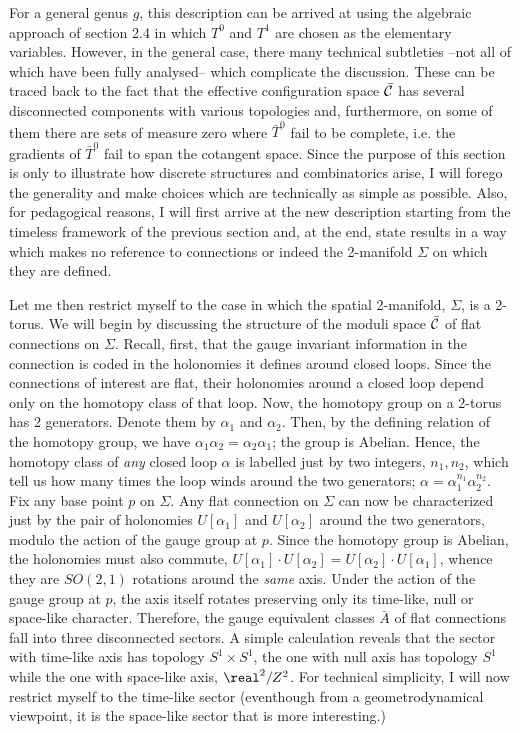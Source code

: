 For a general genus $g$, this description can be arrived at using the
algebraic approach of section 2.4 in which $T^0$ and $T^1$ are chosen as
the elementary variables. However, in the general case, there many
technical subtleties --not all of which have been fully analysed--
which complicate the discussion. These can be traced back to the fact that
the effective configuration space $\bar{\cal C}$ has several disconnected
components with various topologies and, furthermore, on some of them
there are sets of measure zero where $\bar{T}^0$ fail to be complete, i.e.
the gradients of $\bar{T}^0$ fail to span the cotangent space. Since the
purpose of this section is only to illustrate how discrete structures and
combinatorics arise, I will forego the generality and make choices which are
technically as simple as possible. Also, for pedagogical reasons, I will
first arrive at the new description starting from the timeless framework of
the previous section and, at the end, state results in a way which makes
no reference to connections or indeed the 2-manifold $\Sigma$ on which
they are defined.

Let  me then restrict myself to the case in which the spatial 2-manifold,
$\Sigma$, is a 2-torus. We will begin by discussing the structure of the
moduli space $\bar{\cal C}$ of flat connections on $\Sigma$. Recall, first,
that the gauge invariant information in the connection is coded in the
holonomies it defines around closed loops. Since the connections of interest
are flat, their holonomies around a closed loop depend only on the homotopy
class of that loop. Now, the homotopy group on a 2-torus has 2
generators. Denote them by $\alpha_1$ and $\alpha_2$. Then, by the defining
relation of the homotopy group, we have $\alpha_1 \alpha_2 =\alpha_2\alpha_1$;
the group is Abelian. Hence, the homotopy class of {\it any} closed loop
$\alpha$ is labelled just by two integers, $n_1, n_2$, which tell us how many
times the loop winds around the two generators; $\alpha =\alpha_1^{n_1}
\alpha_2^{n_2}$. Fix any base point $p$ on $\Sigma$. Any flat connection on
$\Sigma$ can now be characterized just by the pair of holonomies
$U[{\alpha_1}]$ and $U[{\alpha_2}]$ around the two generators, modulo the
action of the gauge group at $p$. Since the homotopy group is Abelian, the
holonomies must also commute, $U[\alpha_1]\cdot U[\alpha_2] = U[\alpha_2]
\cdot U[\alpha_1]$, whence they are $SO(2,1)$ rotations around the {\it same}
axis. Under the action of the gauge group at $p$, the axis itself rotates
preserving only its time-like, null or space-like character. Therefore, the
gauge equivalent classes $\bar{A}$ of flat connections fall into three
disconnected sectors. A simple calculation reveals that the sector with
time-like axis has topology $S^1\times S^1$, the one with null axis has
topology $S^1$ while the one with space-like axis, $\real^2/Z^2$.
For technical simplicity, I will now restrict myself to the time-like sector
(eventhough from a geometrodynamical viewpoint, it is the space-like sector
that is more interesting.)

